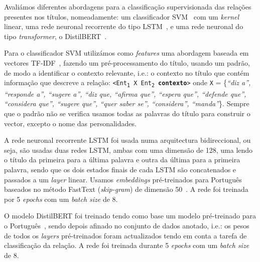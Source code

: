 \documentclass[a4paper, twocolumn, 11pt, twoside]{article}
\begin{document}
Avaliámos diferentes abordagens para a classificação supervisionada das relações presentes nos títulos, nomeadamente: um classificador SVM~\citep{cortes1995support} com um \textit{kernel} linear, uma rede neuronal recorrente do tipo LSTM~\citep{10.1162/neco.1997.9.8.1735}, e uma rede neuronal do tipo \textit{transformer}, o DistilBERT~\citep{9463516}.

Para o classificador SVM utilizámos como \textit{features} uma abordagem baseada em vectores TF-IDF~\citep{DBLP:journals/ipm/SaltonB88}, fazendo um pré-processamento do título, usando um padrão, de modo a identificar o contexto relevante, i.e.: o contexto no título que contém informação que descreve a relação: \texttt{<Ent\textsubscript{1} X Ent\textsubscript{2} \textbf{contexto}>} onde \texttt{X} = \{\textit{“diz a”, “responde a”, “sugere a”, “diz que, “afirma que”, “espera que”, “defende que”, “considera que”, “sugere que”, “quer saber se”, “considera”, “manda”}\}. Sempre que o padrão não se verifica usamos todas as palavras do título para construir o vector, excepto o nome das personalidades.

A rede neuronal recorrente LSTM foi usada numa arquitectura bidireccional, ou seja, são usadas duas redes LSTM, ambas com uma dimensão de 128, uma lendo o título da primeira para a última palavra e outra da última para a primeira palavra, sendo que os dois estados finais de cada LSTM são concatenados e passados a um \textit{layer} linear. Usamos \textit{embeddings} pré-treinados para Português baseados no método FastText (\textit{skip-gram}) de dimensão 50~\citep{hartmann-etal-2017-portuguese}. A rede foi treinada por 5 \textit{epochs} com um \textit{batch size} de 8.

O modelo DistilBERT foi treinado tendo como base um modelo pré-treinado para o Português~\citep{abdaoui-etal-2020-load}, sendo depois afinado no conjunto de dados anotado, i.e.: os pesos de todos os \textit{layers} pré-treinados foram actualizados tendo em conta a tarefa de classificação da relação. A rede foi treinada durante 5 \textit{epochs} com um \textit{batch size} de 8.
\end{document}
